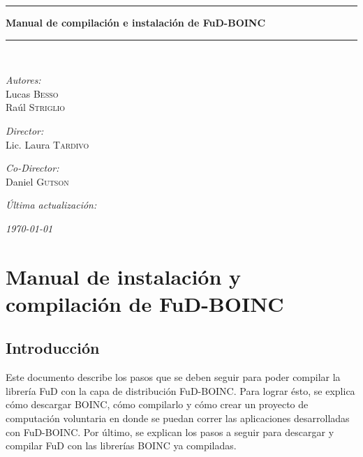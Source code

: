 \documentclass[12pt,spanish,a4paper]{report}
\newcommand{\HRule}{\rule{\linewidth}{0.5mm}}
\begin{document}
\begin{titlepage}
\begin{center}
			\HRule
			{ \Large \bfseries Manual de compilación e instalación de FuD-BOINC\\}
			\HRule 
			\\[4cm]
			

			\begin{multicols}{3}
				\begin{center} \large
					\emph{Autores:}\\
					Lucas \textsc{Besso}\\
					Raúl \textsc{Striglio}
				\end{center}
				\columnbreak  
			
				\begin{center} \large
					\emph{Director:} \\
					Lic. Laura \textsc{Tardivo}
				\end{center}
				\columnbreak  
			
				\begin{center} \large
				\emph{Co-Director:} \\
				Daniel \textsc{Gutson}
				\end{center}
			\end{multicols}
			
			\vfill
			\textit{Última actualización:}
			
			\textit{\today}

		\end{center}
	\end{titlepage}

	\newpage
	
	\tableofcontents
	
	\newpage
	
\part{Manual de instalación y compilación de FuD-BOINC}


\chapter{Introducción}

Este documento describe los pasos que se deben seguir para poder compilar la librería FuD con la capa de distribución FuD-BOINC. Para lograr ésto, se explica cómo descargar BOINC, cómo compilarlo y cómo crear un proyecto de computación voluntaria en donde se puedan correr las aplicaciones desarrolladas con FuD-BOINC. Por último, se explican los pasos a seguir para descargar y compilar FuD con las librerías BOINC ya compiladas.
\end{document}
